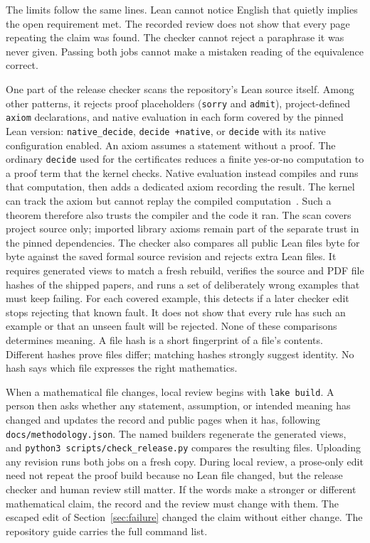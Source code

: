 \documentclass[11pt]{article}
\begin{document}
The limits follow the same lines.  Lean cannot notice English that quietly
implies the open requirement met.  The recorded review does not show that every page
repeating the claim was found.  The checker cannot reject a paraphrase it was
never given.  Passing both jobs cannot make a mistaken reading of the equivalence
correct.

One part of the release checker scans the repository's Lean source itself.
Among other patterns, it rejects proof placeholders (\texttt{sorry} and
\texttt{admit}), project-defined \texttt{axiom} declarations, and native
evaluation in each form covered by the pinned Lean version:
\texttt{native\_decide}, \texttt{decide +native}, or \texttt{decide} with its
native configuration enabled.  An axiom assumes a statement without a proof.
The ordinary \texttt{decide} used for the certificates reduces a finite
yes-or-no computation to a proof term that the kernel checks.  Native
evaluation instead compiles and runs that computation, then adds a dedicated
axiom recording the result.  The kernel can track the axiom but cannot replay
the compiled computation~\cite{leanapi,leanref}.  Such a theorem therefore also trusts the
compiler and the code it ran.  The scan covers project source only; imported
library axioms remain part of the separate trust in the pinned dependencies.
The checker also compares
all public Lean files byte for byte
against the saved formal source revision and rejects extra Lean files.  It
requires generated views to match a fresh rebuild, verifies the source and PDF
file hashes of the shipped papers, and runs a set of deliberately wrong
examples that must keep failing.  For each covered example, this detects if a
later checker edit stops rejecting that known fault.  It does not show that
every rule has such an example or that an unseen fault will be rejected.
None of these comparisons determines meaning.  A file hash is a short fingerprint
of a file's contents.  Different hashes prove files differ; matching hashes strongly
suggest identity.  No hash says which file expresses the right mathematics.

When a mathematical file changes, local review begins with \texttt{lake build}.
A person then asks whether any statement, assumption, or intended meaning has
changed and updates the record and public pages when it has, following
\texttt{docs/methodology.json}.  The named builders regenerate the generated views,
and \texttt{python3 scripts/check\_release.py} compares the resulting files.
Uploading any revision runs both jobs on a fresh copy.  During local
review, a prose-only edit need not repeat the proof build because no Lean file
changed, but the release checker and human review still matter.  If the words
make a stronger or different mathematical claim, the record and the review
must change with them.  The escaped edit of Section~\ref{sec:failure} changed
the claim without either change.  The repository guide carries the full
command list.
\end{document}
